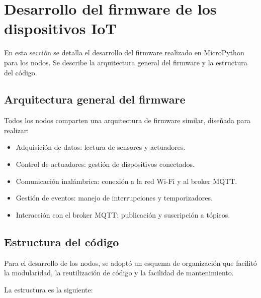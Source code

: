 \section{Desarrollo del firmware de los dispositivos IoT}

En esta sección se detalla el desarrollo del firmware realizado en MicroPython
para los nodos. Se describe la arquitectura general del firmware y la
estructura del código.

\subsection{Arquitectura general del firmware}

Todos los nodos comparten una arquitectura de firmware similar, diseñada para
realizar:

\begin{itemize}
    \item Adquisición de datos: lectura de sensores y actuadores.
    \item Control de actuadores: gestión de dispositivos conectados.
    \item Comunicación inalámbrica: conexión a la red Wi-Fi y al broker MQTT.
    \item Gestión de eventos: manejo de interrupciones y temporizadores.
    \item Interacción con el broker MQTT: publicación y suscripción a tópicos.
\end{itemize}


\subsection{Estructura del código}

Para el desarrollo de los nodos, se adoptó un esquema de organización que
facilitó la modularidad, la reutilización de código y la facilidad de
mantenimiento.

La estructura es la siguiente:

